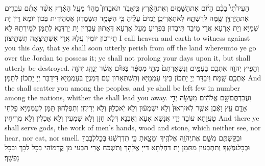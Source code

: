 {הַעִידֹ֩תִי֩ בָכֶ֨ם הַיּ֜וֹם אֶת\maqqaf הַשָּׁמַ֣יִם וְאֶת\maqqaf הָאָ֗רֶץ כִּֽי\maqqaf אָבֹ֣ד תֹּאבֵדוּן֮ מַהֵר֒ מֵעַ֣ל הָאָ֔רֶץ אֲשֶׁ֨ר אַתֶּ֜ם עֹבְרִ֧ים אֶת\maqqaf הַיַּרְדֵּ֛ן שָׁ֖מָּה לְרִשְׁתָּ֑הּ לֹֽא\maqqaf תַאֲרִיכֻ֤ן יָמִים֙ עָלֶ֔יהָ כִּ֥י הִשָּׁמֵ֖ד תִּשָּׁמֵדֽוּן׃}
{אַסְהֵידִית בְּכוֹן יוֹמָא דֵּין יָת שְׁמַיָּא וְיָת אַרְעָא אֲרֵי מֵיבָד תֵּיבְדוּן בִּפְרִיעַ מֵעַל אַרְעָא דְּאַתּוּן עָבְרִין יָת יַרְדְּנָא לְתַמָּן לְמֵירְתַהּ לָא תֵירְכוּן יוֹמִין עֲלַהּ אֲרֵי אִשְׁתֵּיצָאָה תִשְׁתֵּיצוֹן׃}
{I call heaven and earth to witness against you this day, that ye shall soon utterly perish from off the land whereunto ye go over the Jordan to possess it; ye shall not prolong your days upon it, but shall utterly be destroyed.}{}
{וְהֵפִ֧יץ יְהֹוָ֛ה אֶתְכֶ֖ם בָּעַמִּ֑ים וְנִשְׁאַרְתֶּם֙ מְתֵ֣י מִסְפָּ֔ר בַּגּוֹיִ֕ם אֲשֶׁ֨ר יְנַהֵ֧ג יְהֹוָ֛ה אֶתְכֶ֖ם שָֽׁמָּה׃}
{וִיבַדַּר יְיָ יָתְכוֹן בֵּינֵי עַמְמַיָּא וְתִשְׁתְּאַרוּן עַם דְּמִנְיָן בְּעַמְמַיָּא דִּידַבַּר יְיָ יָתְכוֹן לְתַמָּן׃}
{And the \lord\space shall scatter you among the peoples, and ye shall be left few in number among the nations, whither the \lord\space shall lead you away.}{}
{וַעֲבַדְתֶּם\maqqaf שָׁ֣ם אֱלֹהִ֔ים מַעֲשֵׂ֖ה יְדֵ֣י אָדָ֑ם עֵ֣ץ וָאֶ֔בֶן אֲשֶׁ֤ר לֹֽא\maqqaf יִרְאוּן֙ וְלֹ֣א יִשְׁמְע֔וּן וְלֹ֥א יֹֽאכְל֖וּן וְלֹ֥א יְרִיחֻֽן׃}
{וְתִפְלְחוּן תַּמָּן לְעַמְמַיָּא פָלְחֵי טָעֲוָתָא עוֹבָד יְדֵי אֲנָשָׁא אָעָא וְאַבְנָא דְּלָא חָזַן וְלָא שָׁמְעִין וְלָא אָכְלִין וְלָא מְרִיחִין׃}
{And there ye shall serve gods, the work of men’s hands, wood and stone, which neither see, nor hear, nor eat, nor smell.}{}
{וּבִקַּשְׁתֶּ֥ם מִשָּׁ֛ם אֶת\maqqaf יְהֹוָ֥ה אֱלֹהֶ֖יךָ וּמָצָ֑אתָ כִּ֣י תִדְרְשֶׁ֔נּוּ בְּכׇל\maqqaf לְבָבְךָ֖ וּבְכׇל\maqqaf נַפְשֶֽׁךָ׃}
{וְתִתְבְּעוּן מִתַּמָּן יָת דַּחְלְתָא דַּייָ אֱלָהָךְ וְתַשְׁכַּח אֲרֵי תִבְעֵי מִן קֳדָמוֹהִי בְּכָל לִבָּךְ וּבְכָל נַפְשָׁךְ׃}
